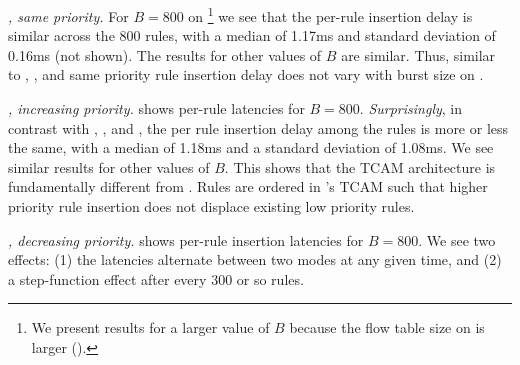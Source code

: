 \emph{\Intel, same priority.} %
For $B=800$ on \Intel\footnote{We present results for a larger value of $B$ 
because the flow table size on \Intel is larger ().} we see that the per-rule
insertion delay is similar across the 800 rules, with a median of 1.17ms and
standard deviation of 0.16ms (not shown). 
The results for other values of $B$ are similar. Thus, similar to
\BroadcomOne, \BroadcomThree, and \IBM same priority rule insertion delay does 
not vary with burst size on \Intel. 

\emph{\Intel, increasing priority.} %
 shows per-rule latencies for
$B=800$. \emph{Surprisingly}, in contrast with \BroadcomOne,
\BroadcomThree, and \IBM, the per rule
insertion delay among the rules is more or less the same, with a
median of 1.18ms and a standard deviation of 1.08ms.  We see similar
results for other values of $B$. This shows that the \Intel TCAM architecture 
is fundamentally different from \Broadcom. 
Rules are ordered in \Intel's TCAM such that higher priority rule insertion
does not displace existing low priority rules. 

\emph{\Intel, decreasing priority.} %
 shows per-rule insertion latencies for
$B=800$. We see two effects: (1) the latencies alternate between two modes at any
given time, and (2) a step-function effect after every 300 or so
rules. 


